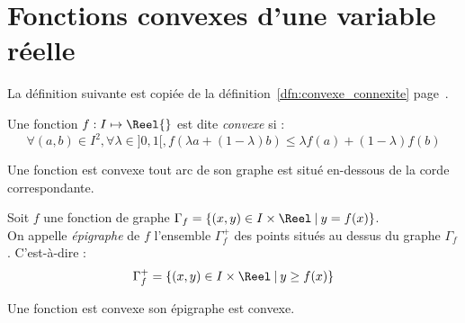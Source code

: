\documentclass[11pt,a4paper,fleqn,pdftex]{report}
\begin{document}
\section{Fonctions convexes d'une variable réelle} %
\label{sec:fonctions_convexes_d_une_variable_reelle}
La définition suivante est copiée de la définition~\ref{dfn:convexe_connexite} page~\pageref{dfn:convexe_connexite}.
\begin{dfn}
   \begin{minipage}{0.75\textwidth}
    Une fonction $f : I \mapsto \Reel{}$ est dite \emph{convexe} si :
   \begin{equation}
   \forall (a,b) \in I^2, \forall \lambda  \in ]0,1[, \boxed{f(\lambda a + (1-\lambda )b) \le \lambda f(a) + (1-\lambda )f(b)}
   \end{equation}
    \end{minipage}\hspace{2mm}
    \begin{minipage}{0.2\textwidth}
    \end{minipage}
\end{dfn}
\begin{theorem}
     Une fonction est convexe \ssi{} tout arc de son graphe est situé en-dessous de la corde correspondante.
\end{theorem}
\begin{dfn}[Épigraphe]
     Soit $f$ une fonction de graphe $\Gamma_f = \{ (x,y)\in I\times \Reel \: |\: y = f(x)\}$.\\
     On appelle \emph{épigraphe} de $f$ l'ensemble $\Gamma_f^+$ des points situés au dessus du graphe $\Gamma_f$. C'est-à-dire : 
     \begin{equation}
     \Gamma_f^+ = \{ (x,y)\in I\times\Reel \: |\: y\ge f(x) \}
     \end{equation}
\end{dfn}
\begin{theorem}
     Une fonction est convexe \ssi{} son épigraphe est convexe.
\end{theorem}
\end{document}

